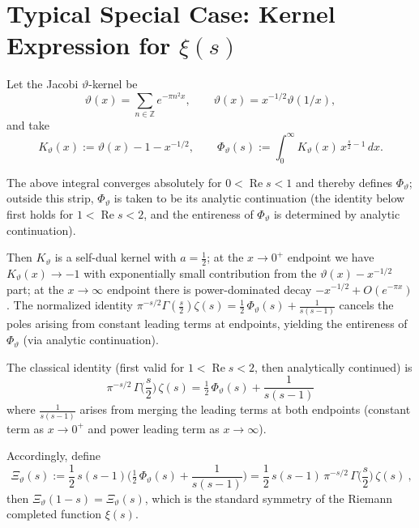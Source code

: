 \documentclass[11pt,a4paper]{article}
\theoremstyle{remark}
\DeclareMathOperator{\Re}{Re}
\begin{document}
\section{Typical Special Case: Kernel Expression for $\xi(s)$}

Let the Jacobi $\vartheta$-kernel be
\begin{equation}
\vartheta(x)=\sum_{n\in\mathbb{Z}}e^{-\pi n^2 x},\qquad \vartheta(x)=x^{-1/2}\vartheta(1/x),
\end{equation}
and take
\begin{equation}
K_\vartheta(x):=\vartheta(x)-1-x^{-1/2},\qquad
\Phi_\vartheta(s):=\int_0^\infty K_\vartheta(x)\,x^{\frac{s}{2}-1}\,dx.
\end{equation}

The above integral converges absolutely for $0<\Re s<1$ and thereby defines $\Phi_\vartheta$; outside this strip, $\Phi_\vartheta$ is taken to be its analytic continuation (the identity below first holds for $1<\Re s<2$, and the entireness of $\Phi_\vartheta$ is determined by analytic continuation).

Then $K_\vartheta$ is a self-dual kernel with $a=\frac{1}{2}$; at the $x\to0^+$ endpoint we have $K_\vartheta(x)\to -1$ with exponentially small contribution from the $\vartheta(x)-x^{-1/2}$ part; at the $x\to\infty$ endpoint there is power-dominated decay $-x^{-1/2}+O(e^{-\pi x})$. The normalized identity $\pi^{-s/2}\Gamma(\frac{s}{2})\zeta(s)=\frac{1}{2}\,\Phi_\vartheta(s)+\frac{1}{s(s-1)}$ cancels the poles arising from constant leading terms at endpoints, yielding the entireness of $\Phi_\vartheta$ (via analytic continuation).

The classical identity (first valid for $1<\Re s<2$, then analytically continued) is
\begin{equation}
\boxed{\ \pi^{-s/2}\,\Gamma\Big(\frac{s}{2}\Big)\,\zeta(s)
=\tfrac{1}{2}\,\Phi_\vartheta(s)+\frac{1}{s(s-1)}\ }
\end{equation}
where $\frac{1}{s(s-1)}$ arises from merging the leading terms at both endpoints (constant term as $x\to0^+$ and power leading term as $x\to\infty$).

Accordingly, define
\begin{equation}
\boxed{\ \Xi_\vartheta(s):=\frac{1}{2}\,s(s-1)\Big(\tfrac{1}{2}\,\Phi_\vartheta(s)+\frac{1}{s(s-1)}\Big)
=\frac{1}{2}\,s(s-1)\,\pi^{-s/2}\,\Gamma\Big(\frac{s}{2}\Big)\,\zeta(s)\ },
\end{equation}
then $\Xi_\vartheta(1-s)=\Xi_\vartheta(s)$, which is the standard symmetry of the Riemann completed function $\xi(s)$.
\end{document}
